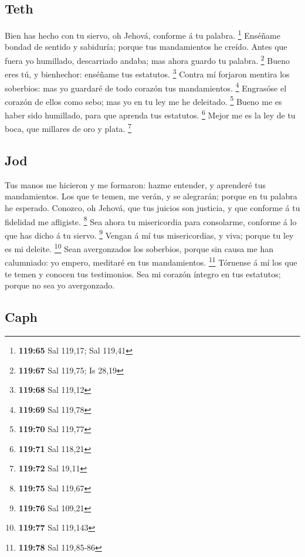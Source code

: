 \hypertarget{teth}{%
\subsection{Teth}\label{teth}}

 Bien has hecho con tu siervo, oh Jehová, conforme á tu
palabra. \footnote{\textbf{119:65} Sal 119,17; Sal 119,41} 
Enséñame bondad de sentido y sabiduría; porque tus mandamientos he
creído.  Antes que fuera yo humillado, descarriado andaba;
mas ahora guardo tu palabra. \footnote{\textbf{119:67} Sal 119,75; Is
  28,19}  Bueno eres tú, y bienhechor: enséñame tus
estatutos. \footnote{\textbf{119:68} Sal 119,12}  Contra mí
forjaron mentira los soberbios: mas yo guardaré de todo corazón tus
mandamientos. \footnote{\textbf{119:69} Sal 119,78} 
Engrasóse el corazón de ellos como sebo; mas yo en tu ley me he
deleitado. \footnote{\textbf{119:70} Sal 119,77}  Bueno me
es haber sido humillado, para que aprenda tus estatutos. \footnote{\textbf{119:71}
  Sal 118,21}  Mejor me es la ley de tu boca, que millares
de oro y plata. \footnote{\textbf{119:72} Sal 19,11}

\hypertarget{jod}{%
\subsection{Jod}\label{jod}}

 Tus manos me hicieron y me formaron: hazme entender, y
aprenderé tus mandamientos.  Los que te temen, me verán, y
se alegrarán; porque en tu palabra he esperado.  Conozco,
oh Jehová, que tus juicios son justicia, y que conforme á tu fidelidad
me afligiste. \footnote{\textbf{119:75} Sal 119,67}  Sea
ahora tu misericordia para consolarme, conforme á lo que has dicho á tu
siervo. \footnote{\textbf{119:76} Sal 109,21}  Vengan á mí
tus misericordias, y viva; porque tu ley es mi deleite. \footnote{\textbf{119:77}
  Sal 119,143}  Sean avergonzados los soberbios, porque sin
causa me han calumniado: yo empero, meditaré en tus mandamientos.
\footnote{\textbf{119:78} Sal 119,85-86}  Tórnense á mí los
que te temen y conocen tus testimonios.  Sea mi corazón
íntegro en tus estatutos; porque no sea yo avergonzado.

\hypertarget{caph}{%
\subsection{Caph}\label{caph}}

